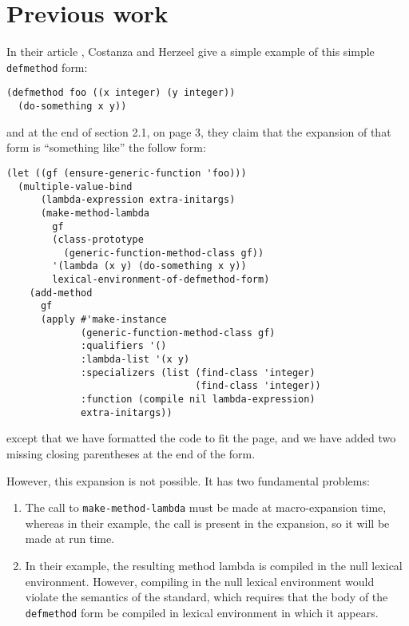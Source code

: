 \section{Previous work}

In their article \cite{Constanza:2008}, Costanza and Herzeel give a
simple example of this simple \texttt{defmethod} form:

\begin{verbatim}
(defmethod foo ((x integer) (y integer))
  (do-something x y))
\end{verbatim}

\noindent
and at the end of section 2.1, on page 3, they claim that the
expansion of that form is ``something like'' the follow form:

{\small\begin{verbatim}
(let ((gf (ensure-generic-function 'foo)))
  (multiple-value-bind
      (lambda-expression extra-initargs)
      (make-method-lambda
        gf
        (class-prototype
          (generic-function-method-class gf))
        '(lambda (x y) (do-something x y))
        lexical-environment-of-defmethod-form)
    (add-method
      gf
      (apply #'make-instance
             (generic-function-method-class gf)
             :qualifiers '()
             :lambda-list '(x y)
             :specializers (list (find-class 'integer)
                                 (find-class 'integer))
             :function (compile nil lambda-expression)
             extra-initargs))
\end{verbatim}}

\noindent
except that we have formatted the code to fit the page, and we have
added two missing closing parentheses at the end of the form.

However, this expansion is not possible.  It has two fundamental
problems:

\begin{enumerate}
\item The call to \texttt{make-method-lambda} must be made at
  macro-expansion time, whereas in their example, the call is present
  in the expansion, so it will be made at run time.
\item In their example, the resulting method lambda is compiled in the
  null lexical environment.  However, compiling in the null lexical
  environment would violate the semantics of the \commonlisp{}
  standard, which requires that the body of the \texttt{defmethod}
  form be compiled in lexical environment in which it appears.
\end{enumerate}

